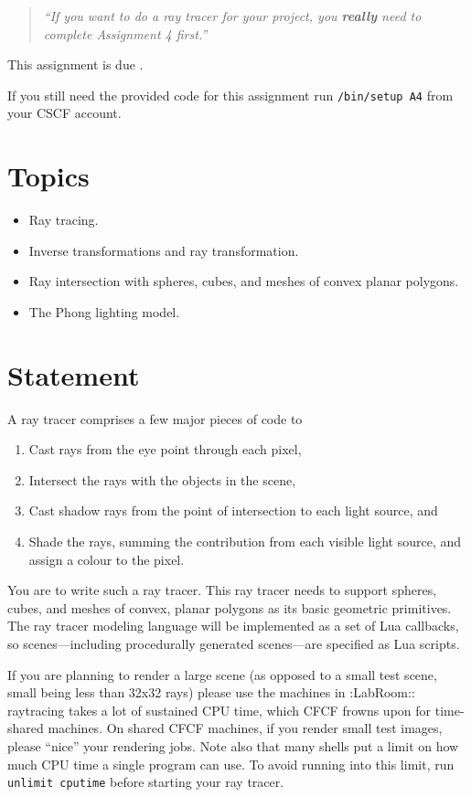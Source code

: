 \begin{quote}
	{\sl 
	``If you want to do a ray tracer for your project, you 
	\/{\bf really} need
	 to complete Assignment 4 first.''
        }\\
\end{quote}
This assignment is due {\bf \AfourDeadline}.

If you still need the provided code for this assignment run
 \texttt{\CourseData/bin/setup A4} from your CSCF account.

\section{Topics}
\begin{itemize}
    \item Ray tracing.
    \item Inverse transformations and ray transformation.
    \item Ray intersection with spheres, cubes, 
	  and meshes of convex planar polygons.
    \item The Phong lighting model.
\end{itemize}

\section{Statement}
A ray tracer comprises a few major pieces of code to 
\begin{enumerate}
    \item Cast rays from the eye point through each pixel,
    \item Intersect the rays with the objects in the scene, 
    \item Cast shadow rays from the point of intersection to each light source, and
    \item Shade the rays, summing the contribution from each visible 
	  light source, and assign a colour to the pixel.
\end{enumerate}
You are to write such a ray tracer.
This ray tracer needs to support spheres, cubes, 
and meshes of convex, planar polygons as its basic geometric primitives.  
The ray tracer modeling language will be implemented
as a set of Lua callbacks, so scenes---including procedurally
generated scenes---are specified as Lua scripts.

If you are planning to render a large scene (as opposed to
a small test scene, small being less than 32x32 rays) please 
use the machines in {:LabRoom:}: raytracing
takes a lot of sustained CPU time, which CFCF frowns upon for 
time-shared machines.   On shared CFCF machines, if 
you render small test images, please ``nice'' your rendering jobs.
Note also that many shells put a limit on how much CPU time a single
program can use.  To avoid running into this limit, run {\tt unlimit cputime}
before starting your ray tracer.

